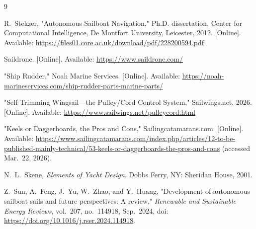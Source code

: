 \begin{thebibliography}{9}

R.~Stekzer, "Autonomous Sailboat Navigation," Ph.D. dissertation, Center for Computational Intelligence, De Montfort University, Leicester, 2012. [Online]. Available: \url{https://files01.core.ac.uk/download/pdf/228200594.pdf}

Saildrone. [Online]. Available: \url{https://www.saildrone.com/}

"Ship Rudder," Noah Marine Services. [Online]. Available: \url{https://noah-marineservices.com/ship-rudder-parts-marine-parts/}

"Self Trimming Wingsail---the Pulley/Cord Control System," Sailwings.net, 2026. [Online]. Available: \url{https://www.sailwings.net/pulleycord.html}

"Keels or Daggerboards, the Pros and Cons," Sailingcatamarans.com. [Online]. Available: \url{https://www.sailingcatamarans.com/index.php/articles/12-to-be-published-mainly-technical/53-keels-or-daggerboards-the-pros-and-cons} (accessed Mar.~22, 2026).

N.~L.~Skene, \emph{Elements of Yacht Design}. Dobbs Ferry, NY: Sheridan House, 2001.

Z.~Sun, A.~Feng, J.~Yu, W.~Zhao, and Y.~Huang, "Development of autonomous sailboat sails and future perspectives: A review," \emph{Renewable and Sustainable Energy Reviews}, vol.~207, no.~114918, Sep.~2024, doi: \url{https://doi.org/10.1016/j.rser.2024.114918}.

\end{thebibliography}
